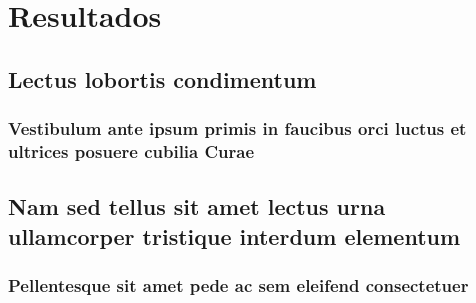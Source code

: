 
\part{Resultados}


\chapter{Lectus lobortis condimentum}

\section{Vestibulum ante ipsum primis in faucibus orci luctus et ultrices
posuere cubilia Curae}

\lipsum[21-22]


\chapter{Nam sed tellus sit amet lectus urna ullamcorper tristique interdum
elementum}

\section{Pellentesque sit amet pede ac sem eleifend consectetuer}

\lipsum[24]
